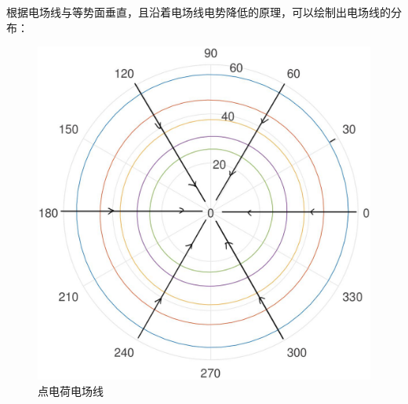 \documentclass{WHUReport}
\begin{document}
\begin{multicols}{2}
	根据电场线与等势面垂直，且沿着电场线电势降低的原理，可以绘制出电场线的分布：
	\begin{figure}[H]
		\centering
		\includegraphics[width=0.8\linewidth]{figs/point_e.jpg}
		\caption{点电荷电场线}
	\end{figure}

\end{multicols}
\end{document}

